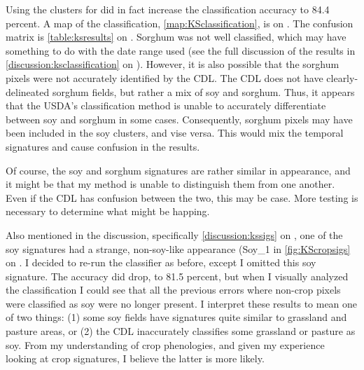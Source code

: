 Using the clusters for did in fact increase the classification accuracy to 84.4 percent. A map of the classification, \cref{map:KSclassification}, is on . The confusion matrix is \cref{table:ksresults} on . Sorghum was not well classified, which may have something to do with the date range used (see the full discussion of the results in \cref{discussion:ksclassification} on ). However, it is also possible that the sorghum pixels were not accurately identified by the CDL. The CDL does not have clearly-delineated sorghum fields, but rather a mix of soy and sorghum. Thus, it appears that the USDA’s classification method is unable to accurately differentiate between soy and sorghum in some cases. Consequently, sorghum pixels may have been included in the soy clusters, and vise versa. This would mix the temporal signatures and cause confusion in the results. 

Of course, the soy and sorghum signatures are rather similar in appearance, and it might be that my method is unable to distinguish them from one another. Even if the CDL has confusion between the two, this may be case. More testing is necessary to determine what might be happing.


Also mentioned in the discussion, specifically \cref{discussion:kssigs} on , one of the soy signatures had a strange, non-soy-like appearance (Soy\_1 in \cref{fig:KScropsigs} on . I decided to re-run the classifier as before, except I omitted this soy signature. The accuracy did drop, to 81.5 percent, but when I visually analyzed the classification I could see that all the previous errors where non-crop pixels were classified as soy were no longer present. I interpret these results to mean one of two things: (1) some soy fields have signatures quite similar to grassland and pasture areas, or (2) the CDL inaccurately classifies some grassland or pasture as soy. From my understanding of crop phenologies, and given my experience looking at crop signatures, I believe the latter is more likely.


